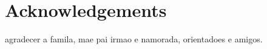 


% 
% 
% 

\begingroup
\let\clearpage\relax
\let\cleardoublepage\relax
\let\cleardoublepage\relax
\chapter*{Acknowledgements}
agradecer a famila, mae pai irmao e namorada, orientadoes e amigos.


\endgroup


